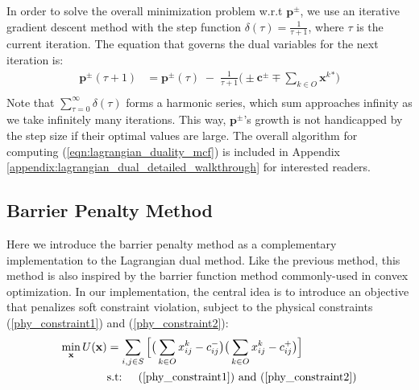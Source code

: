 \documentclass[sigconf]{acmart}
\theoremstyle{definition}
\begin{document}
In order to solve the overall minimization problem w.r.t $\mathbf{p}^{\pm}$, we use an iterative gradient descent method with the step function $\delta(\tau) = \frac{1}{\tau + 1}$, where $\tau$ is the current iteration. The equation that governs the dual variables for the next iteration is:
\begin{equation}\label{gradient_projection}
\begin{aligned}
\mathbf{p}^{\pm}(\tau + 1) %
&= \mathbf{p}^{\pm}(\tau) \; - \; \frac{1}{\tau + 1} \big(\pm \mathbf{c}^{\pm} \mp \sum_{k \in O}\mathbf{x}^k{}^* \big) \\
\end{aligned}
\end{equation}
Note that $\sum\limits_{\tau = 0}^{\infty}\delta(\tau)$ forms a harmonic series, which sum approaches infinity as we take infinitely many iterations. This way, $\mathbf{p}^\pm$'s growth is not handicapped by the step size if their optimal values are large. The overall algorithm for computing (\ref{eqn:lagrangian_duality_mcf}) is included in Appendix \ref{appendix:lagrangian_dual_detailed_walkthrough} for interested readers.



\subsection{Barrier Penalty Method}
Here we introduce the barrier penalty method as a complementary implementation to the Lagrangian dual method. Like the previous method, this method is also inspired by the barrier function method commonly-used in convex optimization. In our implementation, the central idea is to introduce an objective that penalizes soft constraint violation, subject to the physical constraints (\ref{phy_constraint1}) and (\ref{phy_constraint2}):
\begin{equation}
\begin{aligned}
\min\limits_{\mathbf{x}} U(\mathbf{x}) & = \sum_{i, j \in S}\Big[\big(\sum_{k \in O}x_{ij}^k - c_{ij}^-\big) \big(\sum_{k \in O}x_{ij}^k - c_{ij}^+\big)\Big]\\
& \text{s.t: } \quad (\ref{phy_constraint1}) \text{ and } (\ref{phy_constraint2})
\end{aligned}\label{eqn:barrier_objective}
\end{equation}
\end{document}
